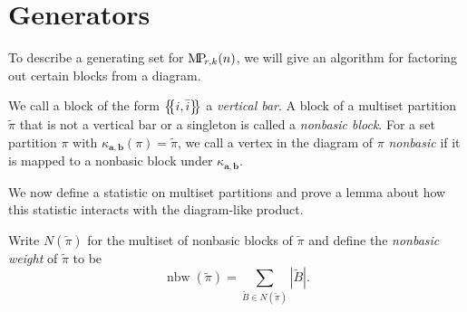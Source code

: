 \documentclass[ALCO,Unicode,published]{cedram}
\newcommand{\bfa}{{\boldsymbol{a}}}
\newcommand{\bfb}{{\boldsymbol{b}}}
\newcommand{\MP}{{\rm M\!P\!}}
\newcommand{\tpi}{{\tilde{\pi}}}
\newcommand{\tB}{{\tilde{B}}}
\newcommand{\multi}[1]{\left\{\mskip-5mu\left\{#1\right\}\mskip-5mu\right\}}
\newcommand{\ov}[1]{\bar{#1}}
\newcommand{\abs}[1]{\left| #1\right |}
\newcommand{\defn}[1]{\textcolor{defncolor}{\emph{#1}}}
\DeclareMathOperator{\nbw}{nbw}
\begin{document}
\section{Generators}\label{sec:generators}

To describe a generating set for $\MP_{r,k}(n)$, we will give an algorithm for factoring out certain blocks from a diagram. 

\begin{defi}
    We call a block of the form $\multi{i,\ov i}$ a \defn{vertical bar}. A block of a multiset partition $\tpi$ that is not a vertical bar or a singleton is called a \defn{nonbasic block}. For a set partition $\pi$ with $\kappa_{\bfa,\bfb}(\pi)=\tpi$, we call a vertex in the diagram of $\pi$ \defn{nonbasic} if it is mapped to a nonbasic block under $\kappa_{\bfa,\bfb}$.
\end{defi}

We now define a statistic on multiset partitions and prove a lemma about how this statistic interacts with the diagram-like product.

\begin{defi}
    Write $N(\tpi)$ for the multiset of nonbasic blocks of $\tpi$ and define the \defn{nonbasic weight} of $\tpi$ to be \[\nbw(\tpi)=\sum_{\tB\in N(\tpi)}\abs{\tB}.\]
\end{defi}
\end{document}
